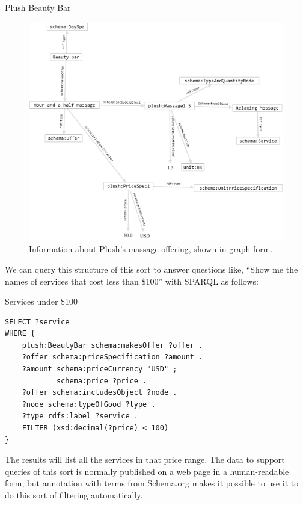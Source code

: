 \begin{example}{Plush Beauty Bar}
\begin{figure}
\centering
\includegraphics[width=5in]{SWWOv3/figure10-plushdata.png}
\caption{Information about Plush's massage offering, shown in graph form.}
\label{fig:ch10.02}
\end{figure}



We can query this structure of this sort to answer questions like,
``Show me the names of services that
cost less than \$100'' with SPARQL as follows:

\begin{query}Services under \$100\end{query}
\begin{lstlisting}
SELECT ?service 
WHERE {
    plush:BeautyBar schema:makesOffer ?offer . 
    ?offer schema:priceSpecification ?amount .
    ?amount schema:priceCurrency "USD" ;
            schema:price ?price .
    ?offer schema:includesObject ?node .
    ?node schema:typeOfGood ?type .
    ?type rdfs:label ?service .
    FILTER (xsd:decimal(?price) < 100)
}
\end{lstlisting}


The results will list all the services in that price range.  The data to 
support queries of this sort is normally published on a web page in a human-readable form,  
but annotation with terms from Schema.org makes it possible to use it to do this sort of filtering automatically. 
\end{example}





